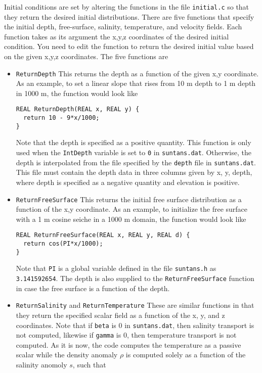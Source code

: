 \documentclass[12pt,oneside]{article}
\begin{document}
Initial conditions are set by altering the functions in the file \verb+initial.c+ so that they return the
desired initial distributions.  There are five functions that specify the initial depth, free-surface,
salinity, temperature, and velocity fields.  Each function takes as its argument the x,y,z coordinates of
the desired initial condition.  You need to edit the function to return the desired initial value based on the
given x,y,z coordinates.  The five functions are
\begin{itemize}
\item \verb+ReturnDepth+ This returns the depth as a function of the given x,y coordinate. 
As an example, to set a linear slope that rises from 10 m depth to 1 m depth in 1000 m, the
function would look like
\begin{verbatim}
REAL ReturnDepth(REAL x, REAL y) {
  return 10 - 9*x/1000;
}
\end{verbatim}
Note that the depth is specified as a positive quantity.  This function is only used when the \verb+IntDepth+ variable is
set to \verb+0+ in \verb+suntans.dat+.  Otherwise, the depth is interpolated from the file specified by the \verb+depth+
file in \verb+suntans.dat+.  This file must contain the depth data in three columns given by x, y, depth, where depth
is specified as a negative quantity and elevation is positive.
\item \verb+ReturnFreeSurface+ This returns the initial free surface distribution as a function of the x,y coordinate.
As an example, to initialize the free surface with a 1 m cosine seiche in a 1000 m domain, the function would look like
\begin{verbatim}
REAL ReturnFreeSurface(REAL x, REAL y, REAL d) {
  return cos(PI*x/1000);
}
\end{verbatim}
Note that \verb+PI+ is a global variable defined in the file \verb+suntans.h+ as \verb+3.141592654+.  The depth
is also supplied to the \verb+ReturnFreeSurface+ function in case the free surface is a function of the depth.
\item \verb+ReturnSalinity+ and \verb+ReturnTemperature+  These are similar functions in that they return the
specified scalar field as a function of the x, y, and z coordinates.  Note that if \verb+beta+ is 0 in \verb+suntans.dat+,
then salinity transport is not computed, likewise if \verb+gamma+ is 0, then temperature transport is not computed.  
As it is now, the code computes the temperature as a passive scalar while the density anomaly $\rho$ is computed solely as a function of 
the salinity anomoly $s$, such that

\end{itemize}
\end{document}
